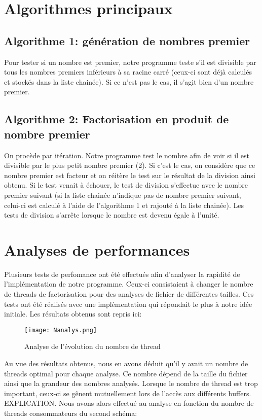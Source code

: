 \documentclass[11pt,a4paper]{article}
\begin{document}
\section*{Algorithmes principaux}
 \subsection*{Algorithme 1: génération de nombres premier}
 
Pour tester si un nombre est premier, notre programme teste s'il est divisible par tous les nombres premiers inférieurs à sa racine carré (ceux-ci sont déjà calculés et stockés dans la liste chainée). Si ce n'est pas le cas, il s'agit bien d'un nombre premier. 
 
 
 \subsection*{Algorithme 2: Factorisation en produit de nombre premier}   
 
 On procède par itération. Notre programme test le nombre afin de voir si il est divisible par le plus petit nombre premier (2). Si c'est le cas, on considère que ce nombre premier est facteur et on réitère le test sur le résultat de la division ainsi obtenu. Si le test venait à échouer, le test de division s'effectue avec le nombre premier suivant (si la liste chainée n'indique pas de nombre premier suivant, celui-ci est calculé à l'aide de l'algorithme 1 et rajouté à la liste chainée). Les tests de division s'arrête lorsque le nombre est devenu égale à l'unité.
 
\section*{Analyses de performances}

Plusieurs tests de perfomance ont été effectués afin d'analyser la rapidité de l'implémentation de notre programme. Ceux-ci consistaient à changer le nombre de threads de factorisation pour des analyses de fichier de différentes tailles. Ces tests ont été réalisés avec une implémentation qui répondait le plus à notre idée initiale. Les résultats obtenus sont repris ici:

\begin{figure}[ht!]
 \centering
 \texttt{[image: Nanalys.png]}
 \caption{Analyse de l'évolution du nombre de thread}
 \label{scheme1}
\end{figure}

Au vue des résultats obtenus, nous en avons déduit qu'il y avait un nombre de threads optimal pour chaque analyse. Ce nombre dépend de la taille du fichier ainsi que la grandeur des nombres analysés. Lorsque le nombre de thread est trop important, ceux-ci se gênent mutuellement lors de l'accès aux différents buffers. EXPLICATION. Nous avons alors effectué au analyse en fonction du nombre de threads consommateurs du second schéma:
\end{document}
